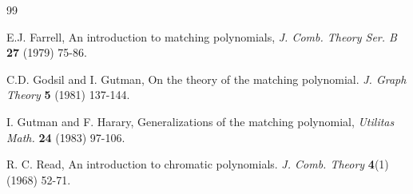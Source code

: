 \documentclass[review]{elsarticle}
\begin{document}
\begin{thebibliography}{99}


 E.J. Farrell, An introduction to matching polynomials, {\it J. Comb. Theory Ser. B} {\bf 27} (1979) 75-86.


 C.D. Godsil and I. Gutman, On the theory of the matching polynomial. {\it J. Graph Theory} {\bf 5} (1981) 137-144.

 I. Gutman and F. Harary, Generalizations of the matching polynomial, {\it Utilitas Math.} {\bf 24} (1983) 97-106.







 R. C. Read, An introduction to chromatic polynomials. {\it J. Comb. Theory} {\bf 4}(1) (1968) 52-71.



\end{thebibliography}
\end{document}
